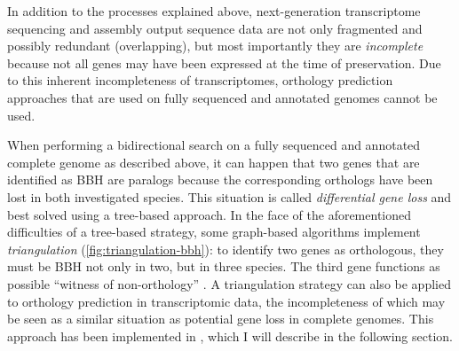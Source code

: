 In addition to the processes explained above, next-generation transcriptome
sequencing and assembly output sequence data are not only fragmented and
possibly redundant (overlapping), but most importantly they are
\emph{incomplete} because not all genes may have been expressed at the time of
preservation. Due to this inherent incompleteness of transcriptomes, orthology
prediction approaches that are used on fully sequenced and annotated genomes
cannot be used.



When performing a bidirectional search on a fully sequenced and annotated
complete genome as described above, it can happen that two genes that are
identified as BBH are paralogs because the corresponding orthologs have been
lost in both investigated species. This situation is called \emph{differential
gene loss} and best solved using a tree-based approach. In the face of the
aforementioned difficulties of a tree-based strategy, some graph-based
algorithms implement \emph{triangulation} (\autoref{fig:triangulation-bbh}): to
identify two genes as orthologous, they must be BBH not only in two, but in
three species. The third gene functions as possible ``witness of non-orthology''
\citep{dessimoz2006}. A triangulation strategy can also be applied to orthology
prediction in transcriptomic data, the incompleteness of which may be seen as a
similar situation as potential gene loss in complete genomes. This approach has
been implemented in \hamstr \citep{ebersberger2009}, which I will describe in
the following section.
